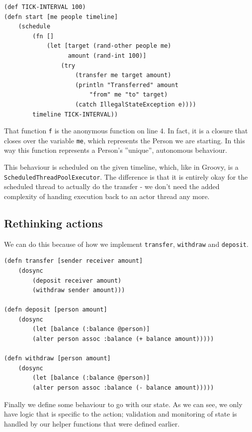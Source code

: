 \documentclass[a4paper,12pt]{kth-mag}
\begin{document}
\begin{listing}[H]
	\begin{verbatim}
(def TICK-INTERVAL 100) 
(defn start [me people timeline]
    (schedule
        (fn [] 
            (let [target (rand-other people me)
                  amount (rand-int 100)]
                (try 
                    (transfer me target amount)
                    (println "Transferred" amount 
                        "from" me "to" target)
                    (catch IllegalStateException e))))
        timeline TICK-INTERVAL))
	\end{verbatim}
\end{listing}

That function \texttt{f} is the anonymous function on line 4. In fact, it is a closure that closes over the variable \texttt{me}, which represents the Person we are starting. In this way this function represents a Person's ''unique'', autonomous behaviour. 

This behaviour is scheduled on the given timeline, which, like in Groovy, is a \texttt{ScheduledThreadPoolExecutor}. The difference is that it is entirely okay for the scheduled thread to actually do the transfer - we don't need the added complexity of handing execution back to an actor thread any more.

\subsection{Rethinking actions}

We can do this because of how we implement \texttt{transfer}, \texttt{withdraw} and \texttt{deposit}.

\begin{listing}[H]
	\begin{verbatim}
(defn transfer [sender receiver amount]
    (dosync
        (deposit receiver amount)
        (withdraw sender amount)))

(defn deposit [person amount]
    (dosync
        (let [balance (:balance @person)]
        (alter person assoc :balance (+ balance amount)))))

(defn withdraw [person amount]
    (dosync
        (let [balance (:balance @person)]
        (alter person assoc :balance (- balance amount)))))
	\end{verbatim}
\end{listing}

Finally we define some behaviour to go with our state. As we can see, we only have logic that is specific to the action; validation and monitoring of state is handled by our helper functions that were defined earlier.
\end{document}
